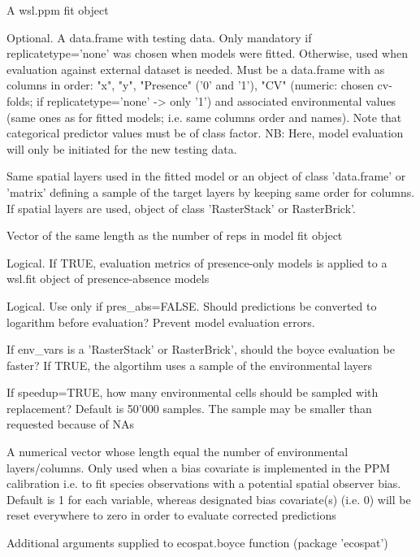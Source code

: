 \documentclass[a4paper]{book}
\begin{document}
\begin{Arguments}
\begin{ldescription}
\item[\code{x}] A wsl.ppm fit object

\item[\code{tester}] Optional. A data.frame with testing data. Only mandatory if replicatetype='none'
was chosen when models were fitted. Otherwise, used when evaluation against external dataset is needed.
Must be a data.frame with as columns in order: "x", "y", "Presence" ('0' and '1'), "CV" (numeric: chosen
cv-folds; if replicatetype='none' -> only '1') and associated environmental values (same ones as
for fitted models; i.e. same columns order and names). Note that categorical predictor values must
be of class factor. NB: Here, model evaluation will only be initiated for the new testing data.

\item[\code{env\_vars}] Same spatial layers used in the fitted model or an object of class 'data.frame' or 
'matrix' defining a sample of the target layers by keeping same order for columns. If spatial layers
are used, object of class 'RasterStack' or RasterBrick'.

\item[\code{thres}] Vector of the same length as the number of reps in model fit object

\item[\code{pres\_abs}] Logical. If TRUE, evaluation metrics of presence-only models is applied to a wsl.fit
object of presence-absence models

\item[\code{log\_trans}] Logical. Use only if pres\_abs=FALSE. Should predictions be converted to logarithm
before evaluation? Prevent model evaluation errors.

\item[\code{speedup}] If env\_vars is a 'RasterStack' or RasterBrick', should the boyce evaluation be faster?
If TRUE, the algortihm uses a sample of the environmental layers

\item[\code{env\_samp}] If speedup=TRUE, how many environmental cells should be sampled with replacement?
Default is 50'000 samples. The sample may be smaller than requested because of NAs

\item[\code{bias\_cov}] A numerical vector whose length equal the number of environmental layers/columns.
Only used when a bias covariate is implemented in the PPM calibration i.e. to fit species observations
with a potential spatial observer bias. Default is 1 for each variable, whereas designated bias
covariate(s) (i.e. 0) will be reset everywhere to zero in order to evaluate corrected predictions

\item[\code{...}] Additional arguments supplied to ecospat.boyce function (package 'ecospat')
\end{ldescription}
\end{Arguments}
\end{document}

